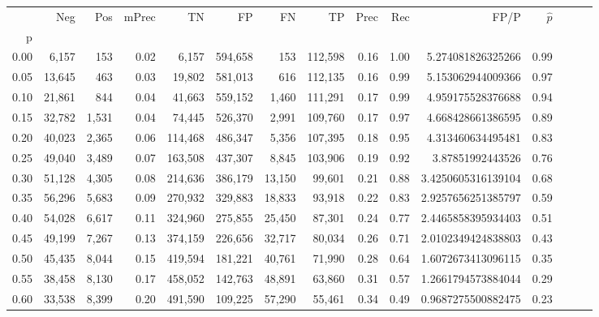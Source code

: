 \begin{tabular}{rrrrrrrrrrrrrrr}
\toprule
{} &     Neg &    Pos & mPrec &       TN &       FP &       FN &       TP &  Prec &   Rec &                  FP/P & $\hat{p}$ \\
p    &         &        &       &          &          &          &          &       &       &                       &           \\
\midrule
0.00 &   6,157 &    153 &  0.02 &    6,157 &  594,658 &      153 &  112,598 &  0.16 &  1.00 &     5.274081826325266 &      0.99 \\
0.05 &  13,645 &    463 &  0.03 &   19,802 &  581,013 &      616 &  112,135 &  0.16 &  0.99 &     5.153062944009366 &      0.97 \\
0.10 &  21,861 &    844 &  0.04 &   41,663 &  559,152 &    1,460 &  111,291 &  0.17 &  0.99 &     4.959175528376688 &      0.94 \\
0.15 &  32,782 &  1,531 &  0.04 &   74,445 &  526,370 &    2,991 &  109,760 &  0.17 &  0.97 &     4.668428661386595 &      0.89 \\
0.20 &  40,023 &  2,365 &  0.06 &  114,468 &  486,347 &    5,356 &  107,395 &  0.18 &  0.95 &     4.313460634495481 &      0.83 \\
0.25 &  49,040 &  3,489 &  0.07 &  163,508 &  437,307 &    8,845 &  103,906 &  0.19 &  0.92 &      3.87851992443526 &      0.76 \\
0.30 &  51,128 &  4,305 &  0.08 &  214,636 &  386,179 &   13,150 &   99,601 &  0.21 &  0.88 &    3.4250605316139104 &      0.68 \\
0.35 &  56,296 &  5,683 &  0.09 &  270,932 &  329,883 &   18,833 &   93,918 &  0.22 &  0.83 &    2.9257656251385797 &      0.59 \\
0.40 &  54,028 &  6,617 &  0.11 &  324,960 &  275,855 &   25,450 &   87,301 &  0.24 &  0.77 &    2.4465858395934403 &      0.51 \\
0.45 &  49,199 &  7,267 &  0.13 &  374,159 &  226,656 &   32,717 &   80,034 &  0.26 &  0.71 &    2.0102349424838803 &      0.43 \\
0.50 &  45,435 &  8,044 &  0.15 &  419,594 &  181,221 &   40,761 &   71,990 &  0.28 &  0.64 &    1.6072673413096115 &      0.35 \\
0.55 &  38,458 &  8,130 &  0.17 &  458,052 &  142,763 &   48,891 &   63,860 &  0.31 &  0.57 &    1.2661794573884044 &      0.29 \\
0.60 &  33,538 &  8,399 &  0.20 &  491,590 &  109,225 &   57,290 &   55,461 &  0.34 &  0.49 &    0.9687275500882475 &      0.23 \\

\end{tabular}
